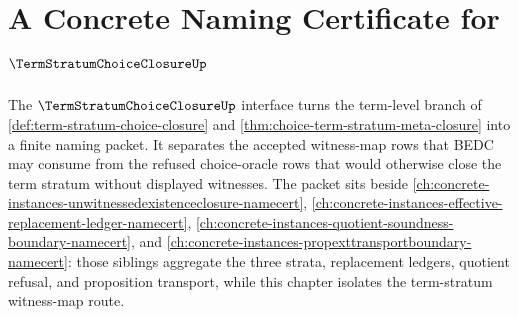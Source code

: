 \chapter{A Concrete Naming Certificate for $\TermStratumChoiceClosureUp$}
\label{ch:concrete-instances-term-stratum-choice-closure-namecert}

The $\TermStratumChoiceClosureUp$ interface turns the term-level branch of \autoref{def:term-stratum-choice-closure} and \autoref{thm:choice-term-stratum-meta-closure} into a finite naming packet. It separates the accepted witness-map rows that BEDC may consume from the refused choice-oracle rows that would otherwise close the term stratum without displayed witnesses. The packet sits beside \autoref{ch:concrete-instances-unwitnessedexistenceclosure-namecert}, \autoref{ch:concrete-instances-effective-replacement-ledger-namecert}, \autoref{ch:concrete-instances-quotient-soundness-boundary-namecert}, and \autoref{ch:concrete-instances-propexttransportboundary-namecert}: those siblings aggregate the three strata, replacement ledgers, quotient refusal, and proposition transport, while this chapter isolates the term-stratum witness-map route.

